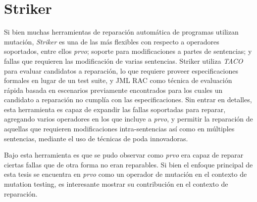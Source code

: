 \section{Striker}
\label{sec:repair.striker}

Si bien muchas herramientas de reparaci\'on autom\'atica de programas utilizan mutaci\'on, \emph{Striker} es una de las m\'as flexibles con respecto a operadores soportados, entre ellos \emph{prvo}; soporte para modificaciones a partes de sentencias; y fallas que requieren las modificaci\'on de varias sentencias. Striker utiliza \emph{TACO} \cite{bibliography.mutation.tools.TACOGaleottiRPF13} para evaluar candidatos a reparaci\'on, lo que requiere proveer especificaciones formales en lugar de un test suite, y JML RAC \cite{bibliography.misc.JMLRAC.LeavensCCRC02} como t\'ecnica de evaluaci\'on r\'apida basada en escenarios previamente encontrados para los cuales un candidato a reparaci\'on no cumpl\'ia con las especificaciones. Sin entrar en detalles, esta herramienta es capaz de expandir las fallas soportadas para reparar, agregando varios operadores en los que incluye a \emph{prvo}, y permitir la reparaci\'on de aquellas que requieren modificaciones intra-sentencias as\'i como en m\'ultiples sentencias, mediante el uso de t\'ecnicas de poda innovadoras.

Bajo esta herramienta es que se pudo observar como \emph{prvo} era capaz de reparar ciertas fallas que de otra forma no eran reparables. Si bien el enfoque principal de esta tesis se encuentra en \emph{prvo} como un operador de mutaci\'on en el contexto de mutation testing, es interesante mostrar su contribuci\'on en el contexto de reparaci\'on.
